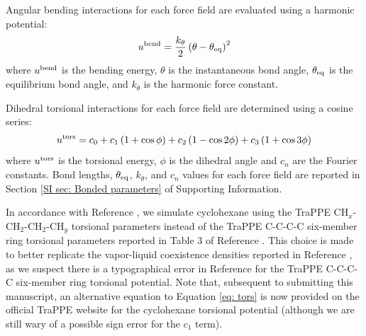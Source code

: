 \documentclass[journal=jced,manuscript=article]{achemso}
\begin{document}
    
    
    
    
    Angular bending interactions for each force field are evaluated using a harmonic potential:
    \begin{equation}
    u^{\rm bend} = \frac{k_\theta}{2} \left(\theta-\theta_{\rm eq}\right)^2
    \end{equation}
    where $u^{\rm bend}$ is the bending energy, $\theta$ is the instantaneous bond angle, $\theta_{\rm eq}$ is the equilibrium bond angle, and $k_\theta$ is the harmonic force constant. 
    
    Dihedral torsional interactions for each force field are determined using a cosine series:
    \begin{equation} \label{eq: tors}
    u^{\rm tors} = c_0 + c_1 \left(1+\cos{\phi}\right) + c_2 \left(1-\cos{2\phi}\right) + c_3 \left(1+\cos{3\phi}\right)
    \end{equation}
    where $u^{\rm tors}$ is the torsional energy, $\phi$ is the dihedral angle and $c_n$ are the Fourier constants. Bond lengths, $\theta_{\rm eq}$, $k_\theta$, and $c_n$ values for each force field are reported in Section \ref{SI sec: Bonded parameters} of Supporting Information.
    
    In accordance with Reference , we simulate cyclohexane using the TraPPE CH$_x$-CH$_2$-CH$_2$-CH$_y$ torsional parameters instead of the TraPPE C-C-C-C six-member ring torsional parameters reported in Table 3 of Reference . This choice is made to better replicate the vapor-liquid coexistence densities reported in Reference , as we suspect there is a typographical error in Reference  for the TraPPE C-C-C-C six-member ring torsional potential. Note that, subsequent to submitting this manuscript, an alternative equation to Equation \ref{eq: tors} is now provided on the official TraPPE website\cite{TraPPE_website} for the cyclohexane torsional potential (although we are still wary of a possible sign error for the $c_1$ term).
    
\end{document}
